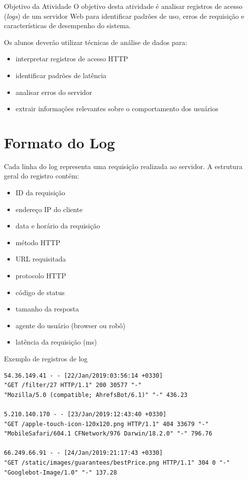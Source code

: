\documentclass[12pt,a4paper,twoside]{report}
\begin{document}
\begin{block}{Objetivo da Atividade}
O objetivo desta atividade é analisar registros de acesso (\textit{logs}) de um servidor Web para identificar padrões de uso, erros de requisição e características de desempenho do sistema.

Os alunos deverão utilizar técnicas de análise de dados para:

\begin{itemize}
\item interpretar registros de acesso HTTP
\item identificar padrões de latência
\item analisar erros do servidor
\item extrair informações relevantes sobre o comportamento dos usuários
\end{itemize}

\end{block}

\section*{Formato do Log}

Cada linha do log representa uma requisição realizada ao servidor.  
A estrutura geral do registro contém:

\begin{itemize}
\item ID da requisição
\item endereço IP do cliente
\item data e horário da requisição
\item método HTTP
\item URL requisitada
\item protocolo HTTP
\item código de status
\item tamanho da resposta
\item agente do usuário (browser ou robô)
\item latência da requisição (ms)
\end{itemize}

\begin{block}{Exemplo de registros de log}

\small

\begin{verbatim}
54.36.149.41 - - [22/Jan/2019:03:56:14 +0330] 
"GET /filter/27 HTTP/1.1" 200 30577 "-" 
"Mozilla/5.0 (compatible; AhrefsBot/6.1)" "-" 436.23

5.210.140.170 - - [23/Jan/2019:12:43:40 +0330] 
"GET /apple-touch-icon-120x120.png HTTP/1.1" 404 33679 "-" 
"MobileSafari/604.1 CFNetwork/976 Darwin/18.2.0" "-" 796.76

66.249.66.91 - - [24/Jan/2019:21:17:43 +0330] 
"GET /static/images/guarantees/bestPrice.png HTTP/1.1" 304 0 "-" 
"Googlebot-Image/1.0" "-" 137.28
\end{verbatim}

\end{block}
\end{document}
